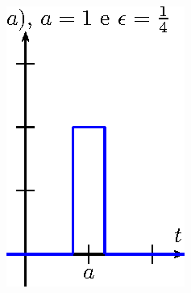 \begin{figure}[!ht]
\begin{center}
\includegraphics{cap_dirac_conv/pics/figura_3}


\end{center}
\end{figure}
